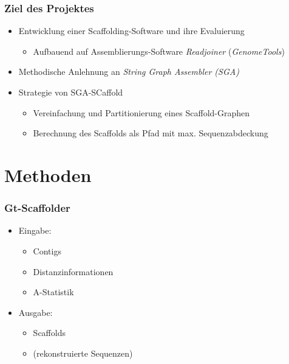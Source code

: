\documentclass[xcolor=pst]{beamer}
\begin{document}
\begin{frame}
  \frametitle{Ziel des Projektes}
  \begin{itemize}
  \item Entwicklung einer Scaffolding-Software und ihre Evaluierung
  \begin{itemize} %
    \item Aufbauend auf Assemblierungs-Software \textit{Readjoiner} (\textit{GenomeTools})
  \end{itemize}
  \item Methodische Anlehnung an \textit{String Graph Assembler (SGA)}
  \item Strategie von SGA-SCaffold
  \begin{itemize}
    \item Vereinfachung und Partitionierung eines Scaffold-Graphen
    \item Berechnung des Scaffolds als Pfad mit max. Sequenzabdeckung
  \end{itemize}
  \end{itemize} %
  \let\thefootnote\relax{}
\end{frame}

\section{Methoden}

\begin{frame}
  \frametitle{Gt-Scaffolder}
  \begin{itemize} %
  \item Eingabe:
    \begin{itemize}
    \item Contigs
    \item Distanzinformationen
    \item A-Statistik %
    \end{itemize}
  \item Ausgabe:
    \begin{itemize}
    \item Scaffolds
    \item (rekonstruierte Sequenzen)
    \end{itemize}
  \end{itemize}
\end{frame}
\end{document}
